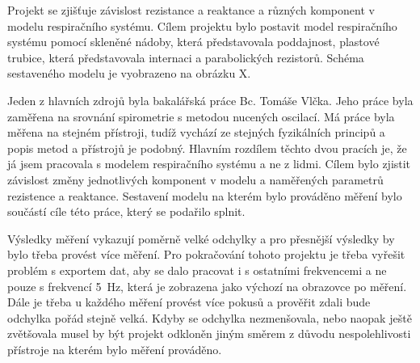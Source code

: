 Projekt se zjišťuje závislost rezistance a reaktance a různých komponent v modelu respiračního systému. 
Cílem projektu bylo postavit model respiračního systému pomocí skleněné nádoby, která představovala poddajnost, plastové trubice, která představovala internaci a parabolických rezistorů.  Schéma sestaveného modelu je vyobrazeno na obrázku X. 

Jeden z hlavních zdrojů byla bakalářská práce Bc. Tomáše Vlčka. Jeho práce byla zaměřena na srovnání spirometrie s metodou nucených oscilací. Má práce byla měřena na stejném přístroji, tudíž vychází ze stejných fyzikálních principů a popis metod a přístrojů je podobný. Hlavním rozdílem těchto dvou pracích je, že já jsem pracovala s modelem respiračního systému a ne z lidmi. Cílem bylo zjistit závislost změny jednotlivých komponent v modelu a naměřených parametrů rezistence a reaktance. Sestavení modelu na kterém bylo prováděno měření bylo součástí cíle této práce, který se podařilo splnit. 

Výsledky měření vykazují poměrně velké odchylky a pro přesnější výsledky by bylo třeba provést více měření. Pro pokračování tohoto projektu je třeba vyřešit problém s exportem dat, aby se dalo pracovat i s ostatními frekvencemi a ne pouze s frekvencí \SI{5}{Hz}, která je zobrazena jako výchozí na obrazovce po měření. Dále je třeba u každého měření provést více pokusů a prověřit zdali bude odchylka pořád stejně velká. Kdyby se odchylka nezmenšovala, nebo naopak ještě zvětšovala musel by být projekt odkloněn jiným směrem z důvodu nespolehlivosti přístroje na kterém bylo měření prováděno. 
